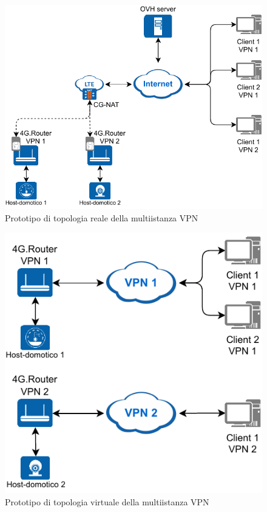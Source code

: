 \begin{figure}
    \centering
    \includegraphics[width=0.8\linewidth]{immagini/diag2-multiistanza_real}
    \caption{Prototipo di topologia reale della multiistanza VPN}
    \label{fig:diag2-multiistanza_real}
\end{figure}

\begin{figure}
    \centering
    \includegraphics[width=0.6\linewidth]{immagini/diag2-multiistanza_virtual}
    \caption{Prototipo di topologia virtuale della multiistanza VPN}
    \label{fig:diag2-multiistanza_virtual}
\end{figure}





